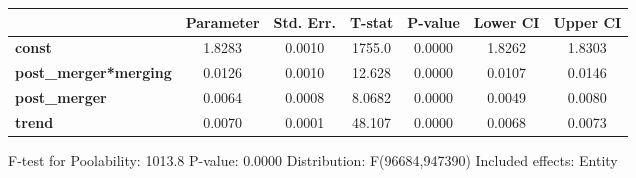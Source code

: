 \documentclass{report}
\begin{document}
\begin{center}
\begin{tabular}{lcccccc}
                              & \textbf{Parameter} & \textbf{Std. Err.} & \textbf{T-stat} & \textbf{P-value} & \textbf{Lower CI} & \textbf{Upper CI}  \\
\midrule
\textbf{const}                &       1.8283       &       0.0010       &      1755.0     &      0.0000      &       1.8262      &       1.8303       \\
\textbf{post\_merger*merging} &       0.0126       &       0.0010       &      12.628     &      0.0000      &       0.0107      &       0.0146       \\
\textbf{post\_merger}         &       0.0064       &       0.0008       &      8.0682     &      0.0000      &       0.0049      &       0.0080       \\
\textbf{trend}                &       0.0070       &       0.0001       &      48.107     &      0.0000      &       0.0068      &       0.0073       \\
\bottomrule
\end{tabular}
\end{center}

F-test for Poolability: 1013.8 \newline
 P-value: 0.0000 \newline
 Distribution: F(96684,947390) \newline
  \newline
 Included effects: Entity
\end{document}
